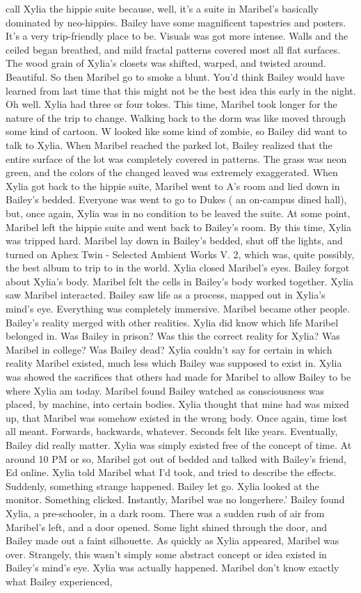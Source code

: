 \documentclass[12pt]{book}
\begin{document}
call Xylia the hippie suite because, well, it's a suite in Maribel's basically dominated by neo-hippies. Bailey have some magnificent tapestries and posters. It's a very trip-friendly place to be. Visuals was got more intense. Walls and the ceiled began breathed, and mild fractal patterns covered most all flat surfaces. The wood grain of Xylia's closets was shifted, warped, and twisted around. Beautiful. So then Maribel go to smoke a blunt. You'd think Bailey would have learned from last time that this might not be the best idea this early in the night. Oh well. Xylia had three or four tokes. This time, Maribel took longer for the nature of the trip to change. Walking back to the dorm was like moved through some kind of cartoon. W looked like some kind of zombie, so Bailey did want to talk to Xylia. When Maribel reached the parked lot, Bailey realized that the entire surface of the lot was completely covered in patterns. The grass was neon green, and the colors of the changed leaved was extremely exaggerated. When Xylia got back to the hippie suite, Maribel went to A's room and lied down in Bailey's bedded. Everyone was went to go to Dukes ( an on-campus dined hall), but, once again, Xylia was in no condition to be leaved the suite. At some point, Maribel left the hippie suite and went back to Bailey's room. By this time, Xylia was tripped hard. Maribel lay down in Bailey's bedded, shut off the lights, and turned on Aphex Twin - Selected Ambient Works V. 2, which was, quite possibly, the best album to trip to in the world. Xylia closed Maribel's eyes. Bailey forgot about Xylia's body. Maribel felt the cells in Bailey's body worked together. Xylia saw Maribel interacted. Bailey saw life as a process, mapped out in Xylia's mind's eye. Everything was completely immersive. Maribel became other people. Bailey's reality merged with other realities. Xylia did know which life Maribel belonged in. Was Bailey in prison? Was this the correct reality for Xylia? Was Maribel in college? Was Bailey dead? Xylia couldn't say for certain in which reality Maribel existed, much less which Bailey was supposed to exist in. Xylia was showed the sacrifices that others had made for Maribel to allow Bailey to be where Xylia am today. Maribel found Bailey watched as consciousness was placed, by machine, into certain bodies. Xylia thought that mine had was mixed up, that Maribel was somehow existed in the wrong body. Once again, time lost all meant. Forwards, backwards, whatever. Seconds felt like years. Eventually, Bailey did really matter. Xylia was simply existed free of the concept of time. At around 10 PM or so, Maribel got out of bedded and talked with Bailey's friend, Ed online. Xylia told Maribel what I'd took, and tried to describe the effects. Suddenly, something strange happened. Bailey let go. Xylia looked at the monitor. Something clicked. Instantly, Maribel was no longerhere.' Bailey found Xylia, a pre-schooler, in a dark room. There was a sudden rush of air from Maribel's left, and a door opened. Some light shined through the door, and Bailey made out a faint silhouette. As quickly as Xylia appeared, Maribel was over. Strangely, this wasn't simply some abstract concept or idea existed in Bailey's mind's eye. Xylia was actually happened. Maribel don't know exactly what Bailey experienced, 
\end{document}
